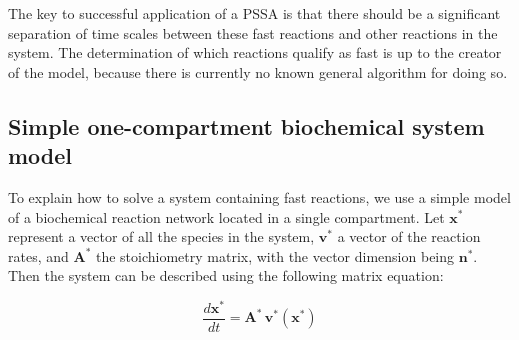 The key to successful application of a PSSA is that there should
be a significant separation of time scales between these fast
reactions and other reactions in the system.  The determination of
which reactions qualify as fast is up to the creator of the model,
because there is currently no known general algorithm for doing
so.


\subsection*{Simple one-compartment biochemical system model}

\newcommand{\Abold}{\ensuremath{\mathbf{A}}}
\newcommand{\Bbold}{\ensuremath{\mathbf{B}}}
\newcommand{\nbold}{\ensuremath{\mathbf{n}}}
\newcommand{\vbold}{\ensuremath{\mathbf{v}}}
\newcommand{\xbold}{\ensuremath{\mathbf{x}}}

\newcommand{\Astar}{\ensuremath{\Abold^{\!*}}}
\newcommand{\nstar}{\ensuremath{\nbold^*}}
\newcommand{\vstar}{\ensuremath{\vbold^*}}
\newcommand{\xstar}{\ensuremath{\xbold^*}}

\newcommand{\xs}{\xstar\xspace}
\newcommand{\xb}{\xbold\xspace}
\newcommand{\vs}{\vstar\xspace}
\newcommand{\vb}{\vbold\xspace}
\newcommand{\ns}{\nstar\xspace}
\newcommand{\As}{\Astar\xspace}
\newcommand{\Ab}{\Abold\xspace}
\newcommand{\Bb}{\Bbold\xspace}

\newcommand{\boldN}{\ensuremath{\mathbf{N}}}
\newcommand{\bN}{\boldN\xspace}
\newcommand{\boldm}{\ensuremath{\mathbf{m}}}
\newcommand{\bm}{\boldm\xspace}

To explain how to solve a system containing fast reactions, we use
a simple model of a biochemical reaction network located in a
single compartment.  Let \xs represent a vector of all the species
in the system, \vs a vector of the reaction rates, and \As the
stoichiometry matrix, with the vector dimension being \ns.  Then
the system can be described using the following matrix equation:
\begin{linenomath}
\begin{equation*}
  \frac{d\xstar}{dt} = \Astar \, \vstar (\xstar) 
\end{equation*}
\end{linenomath}

